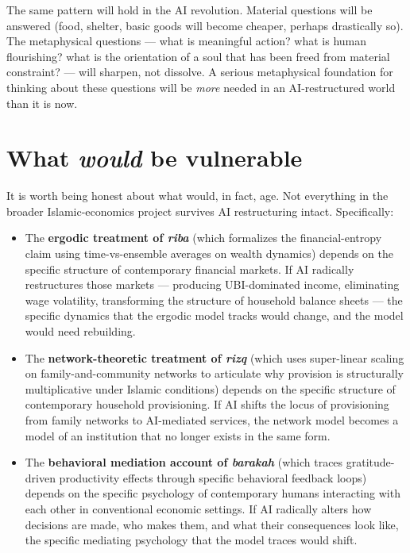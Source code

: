 \documentclass[11pt,a4paper]{article}
\newcommand{\arb}[1]{\textit{#1}}
\begin{document}
The same pattern will hold in the AI revolution. Material
questions will be answered (food, shelter, basic goods will become
cheaper, perhaps drastically so). The metaphysical questions ---
what is meaningful action? what is human flourishing? what is the
orientation of a soul that has been freed from material
constraint? --- will sharpen, not dissolve. A serious metaphysical
foundation for thinking about these questions will be \textit{more}
needed in an AI-restructured world than it is now.

\section{What \textit{would} be vulnerable}
\label{sec:vulnerable}

It is worth being honest about what would, in fact, age. Not
everything in the broader Islamic-economics project survives AI
restructuring intact. Specifically:

\begin{itemize}[leftmargin=2em]
    \item The \textbf{ergodic treatment of \arb{riba}} (which
    formalizes the financial-entropy claim using time-vs-ensemble
    averages on wealth dynamics) depends on the specific
    structure of contemporary financial markets. If AI radically
    restructures those markets --- producing UBI-dominated
    income, eliminating wage volatility, transforming the
    structure of household balance sheets --- the specific
    dynamics that the ergodic model tracks would change, and
    the model would need rebuilding.

    \item The \textbf{network-theoretic treatment of \arb{rizq}}
    (which uses super-linear scaling on family-and-community
    networks to articulate why provision is structurally
    multiplicative under Islamic conditions) depends on the
    specific structure of contemporary household provisioning.
    If AI shifts the locus of provisioning from family networks
    to AI-mediated services, the network model becomes a model
    of an institution that no longer exists in the same form.

    \item The \textbf{behavioral mediation account of
    \arb{barakah}} (which traces gratitude-driven productivity
    effects through specific behavioral feedback loops) depends
    on the specific psychology of contemporary humans interacting
    with each other in conventional economic settings. If AI
    radically alters how decisions are made, who makes them, and
    what their consequences look like, the specific mediating
    psychology that the model traces would shift.
\end{itemize}
\end{document}
